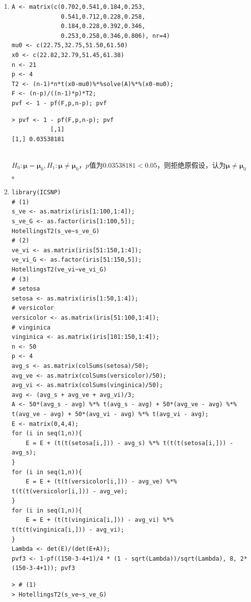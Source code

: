 \begin{enumerate}
\begin{lstlisting}
data:  boy
T.2 = 4.4343, df = 3, p-value = 0.2182
alternative hypothesis: true location is not equal to c(155,38,2205)
\end{lstlisting}
        \summary\\
        $H_0:$数据均值向量等于$(155,38,2205)^{\mathrm{T}}$，$H_1:$数据均值向量不等于$(155,38,2205)^{\mathrm{T}}$，
        \begin{enumerate}[label=(\arabic*)]
            \item 用统计量$F$检验，$p$值为$0.2732>0.05$，则接受原假设，认为数据均值向量等于$(155,38,2205)^{\mathrm{T}}$。
            \item 用统计量$\chi^2$检验，$p$值为$0.2182>0.05$，则接受原假设，认为数据均值向量等于$(155,38,2205)^{\mathrm{T}}$。
        \end{enumerate}
        综上，接受原假设，认为数据均值向量等于$(155,38,2205)^{\mathrm{T}}$。
        \item
        \code
\begin{lstlisting}
A <- matrix(c(0.702,0.541,0.184,0.253,
              0.541,0.712,0.228,0.258,
              0.184,0.228,0.392,0.346,
              0.253,0.258,0.346,0.806), nr=4)
mu0 <- c(22.75,32.75,51.50,61.50)
x0 <- c(22.82,32.79,51.45,61.38)
n <- 21
p <- 4
T2 <- (n-1)*n*t(x0-mu0)%*%solve(A)%*%(x0-mu0);
F <- (n-p)/((n-1)*p)*T2;
pvf <- 1 - pf(F,p,n-p); pvf
\end{lstlisting}
        \out
\begin{lstlisting}
> pvf <- 1 - pf(F,p,n-p); pvf
           [,1]
[1,] 0.03538181
\end{lstlisting}
        \summary\\
        $H_0:\pmb{\mu}=\pmb{\mu}_0,H_1:\pmb{\mu} \neq \pmb{\mu}_0$，$p$值为$0.03538181<0.05$，则拒绝原假设，认为$\pmb{\mu} \neq \pmb{\mu}_0$。
        \item
        \code
\begin{lstlisting}
library(ICSNP)
# (1)
s_ve <- as.matrix(iris[1:100,1:4]);
s_ve_G <- as.factor(iris[1:100,5]);
HotellingsT2(s_ve~s_ve_G)
# (2)
ve_vi <- as.matrix(iris[51:150,1:4]);
ve_vi_G <- as.factor(iris[51:150,5]);
HotellingsT2(ve_vi~ve_vi_G)
# (3)
# setosa
setosa <- as.matrix(iris[1:50,1:4]);
# versicolor
versicolor <- as.matrix(iris[51:100,1:4]);
# vinginica
vinginica <- as.matrix(iris[101:150,1:4]);
n <- 50
p <- 4
avg_s <- as.matrix(colSums(setosa)/50);
avg_ve <- as.matrix(colSums(versicolor)/50);
avg_vi <- as.matrix(colSums(vinginica)/50);
avg <- (avg_s + avg_ve + avg_vi)/3;
A <- 50*(avg_s - avg) %*% t(avg_s - avg) + 50*(avg_ve - avg) %*% t(avg_ve - avg) + 50*(avg_vi - avg) %*% t(avg_vi - avg);
E <- matrix(0,4,4);
for (i in seq(1,n)){
	E = E + (t(t(setosa[i,])) - avg_s) %*% t(t(t(setosa[i,])) - avg_s);
}
for (i in seq(1,n)){
	E = E + (t(t(versicolor[i,])) - avg_ve) %*% t(t(t(versicolor[i,])) - avg_ve);
}
for (i in seq(1,n)){
	E = E + (t(t(vinginica[i,])) - avg_vi) %*% t(t(t(vinginica[i,])) - avg_vi);
}
Lambda <- det(E)/(det(E+A));
pvf3 <- 1-pf((150-3-4+1)/4 * (1 - sqrt(Lambda))/sqrt(Lambda), 8, 2*(150-3-4+1)); pvf3
\end{lstlisting}
        \out
\begin{lstlisting}
> # (1)
> HotellingsT2(s_ve~s_ve_G)


\end{lstlisting}
\end{enumerate}
